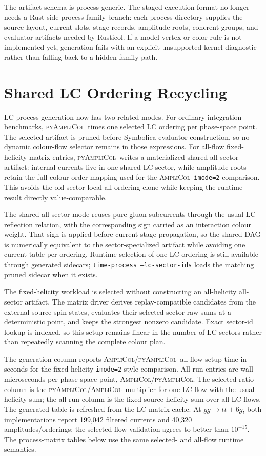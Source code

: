 \documentclass[10pt]{article}
\newcommand{\AC}{\textsc{AmpliCol}}
\newcommand{\PAC}{\textsc{pyAmpliCol}}
\begin{document}
The artifact schema is process-generic.  The staged execution format no longer
needs a Rust-side process-family branch: each process directory supplies the
source layout, current slots, stage records, amplitude roots, coherent groups,
and evaluator artifacts needed by Rusticol.  If a model vertex or color rule is
not implemented yet, generation fails with an explicit unsupported-kernel
diagnostic rather than falling back to a hidden family path.

\section{Shared LC Ordering Recycling}

LC process generation now has two related modes.  For ordinary integration
benchmarks, \PAC\ times one selected LC ordering per phase-space point.  The
selected artifact is pruned before Symbolica evaluator construction, so no
dynamic colour-flow selector remains in those expressions.  For all-flow
fixed-helicity matrix entries, \PAC\ writes a materialized shared all-sector
artifact: internal currents live in one shared LC sector, while amplitude roots
retain the full colour-order mapping used for the \AC\ \texttt{imode=2}
comparison.  This avoids the old sector-local all-ordering clone while keeping
the runtime result directly value-comparable.

The shared all-sector mode reuses pure-gluon subcurrents through the usual LC
reflection relation, with the corresponding sign carried as an interaction
colour weight.  That sign is applied before current-stage propagation, so the
shared DAG is numerically equivalent to the sector-specialized artifact while
avoiding one current table per ordering.  Runtime selection of one LC ordering
is still available through generated sidecars; \texttt{time-process
--lc-sector-ids} loads the matching pruned sidecar when it exists.

The fixed-helicity workload is selected without constructing an all-helicity
all-sector artifact.  The matrix driver derives replay-compatible candidates
from the external source-spin states, evaluates their selected-sector raw sums
at a deterministic point, and keeps the strongest nonzero candidate.  Exact
sector-id lookup is indexed, so this setup remains linear in the number of LC
sectors rather than repeatedly scanning the complete colour plan.



\noindent\footnotesize The generation column reports \AC/\PAC\ all-flow setup
time in seconds for the fixed-helicity \texttt{imode=2}-style comparison.  All
run entries are wall microseconds per phase-space point, \AC/\PAC.  The
selected-ratio column is the \PAC/\AC\ multiplier for one LC flow with the
usual helicity sum; the all-run column is the fixed-source-helicity sum over
all LC flows.  The generated table is refreshed from the LC matrix cache.  At
\(gg\to t\bar t+6g\), both implementations report 199,042 filtered currents
and 40,320 amplitudes/orderings; the selected-flow validation agrees to better
than \(10^{-15}\).  The process-matrix tables below use the same selected- and
all-flow runtime semantics.
\end{document}
